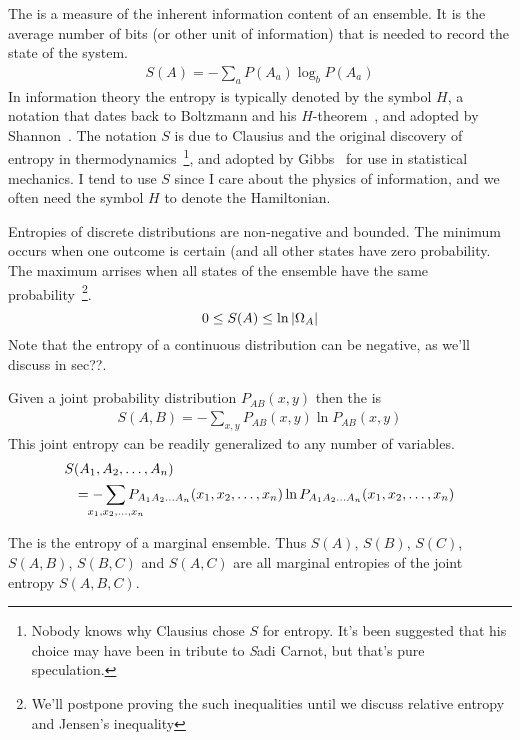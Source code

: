 \documentclass[Lectures.tex]{subfiles}
\begin{document}
The  is a measure of the inherent information content of an ensemble. It is the average number of bits (or other unit of information) that is needed to record the state of the system. 
\begin{align}
\label{Entropy}
 S(A) = -\sum_a P(A_a) \log_b P(A_a) 
\end{align}
In information theory the entropy is typically denoted by the symbol $H$, a notation that dates back to Boltzmann and his $H$-theorem~\cite{Boltzmann1872a}, and adopted by Shannon~\cite{Shannon1948a}. The notation $S$ is due to Clausius and the original discovery of entropy in thermodynamics~\cite{Clausius1865a}\footnote{Nobody knows why Clausius chose $S$ for entropy. It's been suggested that his choice may have been in tribute to {\sl S}adi Carnot, but that's pure speculation.}, and adopted by Gibbs~\cite{Gibbs1902a} for use in statistical mechanics. I tend to use $S$ since I care about the physics of information, and we often need the symbol $H$ to denote the Hamiltonian.

Entropies of discrete distributions are non-negative and bounded. The minimum occurs when one outcome is certain (and all other states have zero probability. The maximum arrises when all states of the ensemble have the same probability~\footnote{We'll postpone proving the such inequalities until we discuss relative entropy and Jensen's inequality \pageref{???}}.
\[
0 \leq S(A)   \leq \ln |\Omega_A |
\notag
\]
Note that the entropy of a continuous distribution can be negative, as we'll discuss in sec??.

Given a joint probability distribution $P_{AB}(x, y)$ then the  is
\begin{align}
\label{joint}
S(A,B) = -\sum_{x,y} P_{AB}(x, y) \ln P_{AB}(x, y)
\end{align}
This joint entropy can be readily generalized to any number of variables.
\begin{align}
\notag 
S&(A_1, A_2, \ldots, A_n) 
\\ \notag
& = -\smashoperator{\sum_{x_1,x_2,\ldots,x_n}} P_{A_1 A_2 \ldots A_n}({x_1}, {x_2}, \ldots, {x_n}) \ln P_{A_1 A_2 \ldots A_n}({x_1}, {x_2}, \ldots, {x_n})
\end{align}


The  is the entropy of a marginal ensemble. Thus $S(A)$, $S(B)$, $S(C)$, $S(A,B)$, $S(B,C)$ and $S(A,C)$ are all marginal entropies of the joint entropy $S(A,B,C)$.
\end{document}
